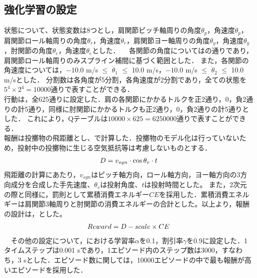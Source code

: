 \begin{small}
\subsection{強化学習の設定}
状態について、状態変数は8つとし，肩関節ピッチ軸周りの角度$\theta_{p}$，角速度$\dot{\theta}_{p}$，肩関節ロール軸周りの角度$\theta_{r}$，角速度$\dot{\theta}_{r}$，肩関節ヨー軸周りの角度$\theta_{y}$，角速度$\dot{\theta}_{y}$，肘関節の角度$\theta_{e}$，角速度$\dot{\theta}_{e}$とした．
　各関節の角度についてはの通りであり，肩関節ロール軸周りのみスプライン補間に基づく範囲とした．
また，各関節の角速度については，$-10.0$ m/s $\le$ $\dot{\theta}_{1}$ $\le$ 10.0 m/s，$-10.0$ m/s $\le$ $\dot{\theta}_{2}$ $\le$ 10.0 m/sとした．
分割数は各角度が5分割，各角速度が2分割であり，全ての状態を$5^{4}\times 2^{4}=10000$通りで表すことができる．\\
行動は，全625通りに設定した．肩の各関節にかかるトルクを正2通り，0，負2通りの計5通り，同様に肘関節にかかるトルクも正2通り，0，負2通りの計5通りとした．
これにより，Qテーブルは$10000 \times 625=6250000$通りで表すことができる．\\
報酬は投擲物の飛距離とし、で計算した．投擲物のモデル化は行っていないため，投射中の投擲物に生じる空気抵抗等は考慮しないものとする．
\begin{eqnarray}
  \equlabel{14}
  D = v_{syn} \cdot \cos\theta_{v} \cdot t
\end{eqnarray}
飛距離の計算にあたり，$v_{syn}$はピッチ軸方向，ロール軸方向，ヨー軸方向の3方向成分を合成した手先速度、$\theta_{v}$は投射角度、$t$は投射時間とした。
また，2次元の際と同様に，罰則として累積消費エネルギー$CE$を採用した．累積消費エネルギーは肩関節3軸周りと肘関節の消費エネルギーの合計とした。以上より，報酬の設計は，とした。
\begin{eqnarray}
  \equlabel{15}
  Reward = D - scale \times CE
\end{eqnarray}
　その他の設定について，における学習率$\alpha$を0.1，割引率$\gamma$を0.9に設定した．1タイムステップは0.001 sであり，1エピソード内のステップ数は3000，すなわち，3 sとした．エピソード数に関しては，10000エピソードの中で最も報酬が高いエピソードを採用した．

\end{small}
